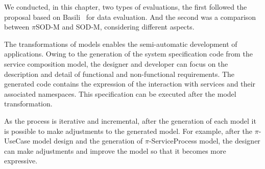 We conducted, in this chapter, two types of evaluations, the first followed the
proposal based on Basili~\cite{basili:1985} for data evaluation. And the second
was a comparison between $\pi$SOD-M and SOD-M, considering different aspects. 
  

The transformations of models enables the semi-automatic
development of applications. Owing to the generation of the
system specification code from the service composition model, the designer and
developer can focus on the description and detail of functional and non-functional requirements. The
generated code contains the expression of the interaction with services and
their associated namespaces. This specification can be executed after the model
transformation.

As the process is iterative and incremental, after the generation of each model
it is possible to make adjustments to the generated model. For example, after
the $\pi$-UseCase model design and the generation of $\pi$-ServiceProcess 
model, the designer can make adjustments and improve the model so that it
becomes more expressive. 

 

